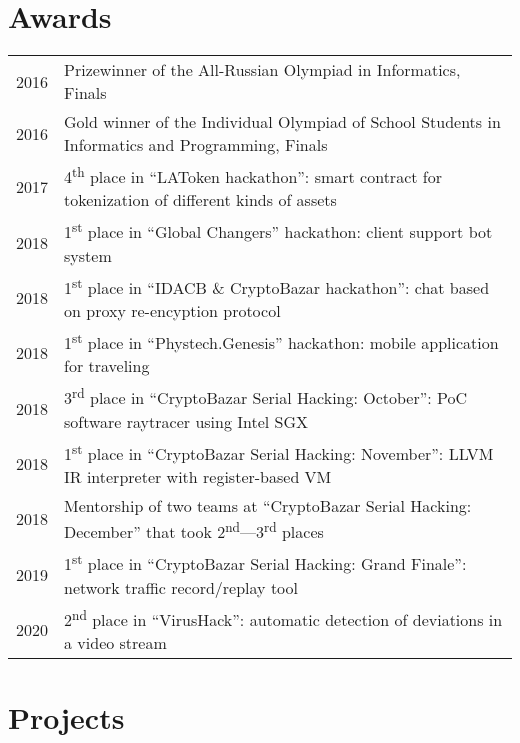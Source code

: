 \documentclass[10pt]{article}
\begin{document}
\medskip

\section{Awards}

\begin{tabular}{ l l }
    2016 & Prizewinner of the All-Russian Olympiad in Informatics, Finals \\
    2016 & Gold winner of the Individual Olympiad of School Students in Informatics and Programming, Finals \\
    2017 & 4\textsuperscript{th} place in ``LAToken hackathon'': smart contract for tokenization of different kinds of assets \\
    2018 & 1\textsuperscript{st} place in ``Global Changers'' hackathon: client support bot system \\
    2018 & 1\textsuperscript{st} place in ``IDACB \& CryptoBazar hackathon'': chat based on proxy re-encyption protocol \\
    2018 & 1\textsuperscript{st} place in ``Phystech.Genesis'' hackathon: mobile application for traveling \\
    2018 & 3\textsuperscript{rd} place in ``CryptoBazar Serial Hacking: October'': PoC software raytracer using Intel SGX \\
    2018 & 1\textsuperscript{st} place in ``CryptoBazar Serial Hacking: November'': LLVM IR interpreter with register-based VM \\
    2018 & Mentorship of two teams at ``CryptoBazar Serial Hacking: December'' that took 2\textsuperscript{nd}---3\textsuperscript{rd} places \\
    2019 & 1\textsuperscript{st} place in ``CryptoBazar Serial Hacking: Grand Finale'': network traffic record/replay tool \\
    2020 & 2\textsuperscript{nd} place in ``VirusHack'': automatic detection of deviations in a video stream \\
\end{tabular}

\medskip

\section{Projects}
\end{document}
